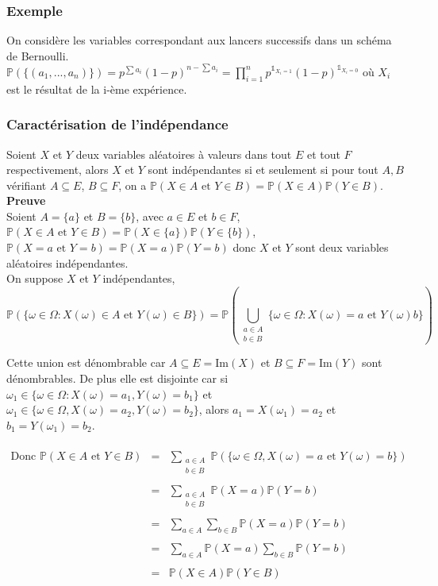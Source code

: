 \documentclass[a4paper,10pt]{book} %
\renewcommand{\P}{\mathbb{P}} %
\newcommand{\Ima}{\mathrm{Im}} %
\newcommand{\indi}{\mathds{1}} %
\begin{document}
\subsubsection{Exemple}
On considère les variables correspondant aux lancers successifs dans un schéma de Bernoulli.\\

$\displaystyle \P(\{(a_1,...,a_n)\})=p^{\sum a_i}(1-p)^{n-\sum a_i}=\prod_{i=1}^{n}p^{\indi_{X_i=1}}(1-p)^{\indi_{X_i=0}}$ où $X_i$ est le résultat de la i-ème expérience.

\newpage

\subsubsection{Caractérisation de l'indépendance}
Soient $X$ et $Y$ deux variables aléatoires à valeurs dans tout $E$ et tout $F$ respectivement, alors $X$ et $Y$ sont indépendantes si et seulement si pour tout $A,B$ vérifiant $A\subseteq E$, $B\subseteq F$, on a $\P(X\in A\text{ et }Y\in B)=\P(X\in A)\P(Y\in B)$.\\

\textbf{Preuve}\\

Soient $A=\{a\}$ et $B=\{b\}$, avec $a\in E$ et $b \in F$,\\
$\P(X\in A \text{ et }Y\in B)=\P(X\in\{a\}) \P(Y\in\{b\})$, $\P(X=a\text{ et }Y=b)=\P(X=a)\P(Y=b)$ donc $X$ et $Y$ sont deux variables aléatoires indépendantes.\\

On suppose $X$ et $Y$ indépendantes, $$\P(\{\omega \in \Omega : X(\omega)\in A\text{ et }Y(\omega)\in B \})=\P(\bigcup_{\substack{a\in A\\b\in B}}\{\omega \in \Omega : X(\omega)=a\text{ et }Y(\omega)b \})$$

Cette union est dénombrable car $A\subseteq E=\Ima(X)$ et $B\subseteq F=\Ima(Y)$ sont dénombrables. De plus elle est disjointe car si $\omega_1\in \{\omega\in \Omega : X(\omega)=a_1, Y(\omega)=b_1 \}$ et\\
$\omega_1\in \{\omega\in \Omega, X(\omega)=a_2, Y(\omega)=b_2 \}$, alors $a_1=X(\omega_1)=a_2$ et $b_1=Y(\omega_1)=b_2$.\\\\

$\begin{array}{rcl}\displaystyle\text{Donc }\P(X\in A\text{ et }Y\in B)&=&\displaystyle\sum_{\substack{a\in A\\b\in B}}\P(\{\omega\in \Omega, X(\omega)=a\text{ et }Y(\omega)=b \})\\\\
&=& \displaystyle\sum_{\substack{a\in A\\b\in B}}\P(X=a)\P(Y=b) \\\\
&=& \displaystyle\sum_{a\in A}\sum_{b\in B}\P(X=a)\P(Y=b) \\\\
&=& \displaystyle\sum_{a\in A}\P(X=a)\sum_{b\in B}\P(Y=b)\\\\
&=& \displaystyle\P(X\in A)\P(Y\in B)
\end{array}$
\end{document}
